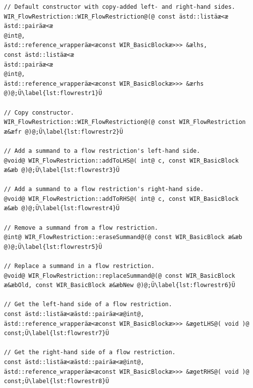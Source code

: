 \begin{lstlisting}[style=code,float=!b,caption={Public Interface of Class \texttt{WIR\_FlowRestriction}},label=lst:flowrestr]
// Default constructor with copy-added left- and right-hand sides.
WIR_FlowRestriction::WIR_FlowRestriction@(@ const ästd::listäæ<æ                                                                                                  ästd::pairäæ<æ                                                                                                  @int@,                                                                                                      ästd::reference_wrapperäæ<æconst WIR_BasicBlockæ>>> &ælhs,                                            const ästd::listäæ<æ                                                                                                  ästd::pairäæ<æ                                                                                                  @int@,                                                                                                      ästd::reference_wrapperäæ<æconst WIR_BasicBlockæ>>> &ærhs @)@;Ü\label{lst:flowrestr1}Ü

// Copy constructor.
WIR_FlowRestriction::WIR_FlowRestriction@(@ const WIR_FlowRestriction æ&æfr @)@;Ü\label{lst:flowrestr2}Ü

// Add a summand to a flow restriction's left-hand side.
@void@ WIR_FlowRestriction::addToLHS@( int@ c, const WIR_BasicBlock æ&æb @)@;Ü\label{lst:flowrestr3}Ü

// Add a summand to a flow restriction's right-hand side.
@void@ WIR_FlowRestriction::addToRHS@( int@ c, const WIR_BasicBlock æ&æb @)@;Ü\label{lst:flowrestr4}Ü

// Remove a summand from a flow restriction.
@int@ WIR_FlowRestriction::eraseSummand@(@ const WIR_BasicBlock æ&æb @)@;Ü\label{lst:flowrestr5}Ü

// Replace a summand in a flow restriction.
@void@ WIR_FlowRestriction::replaceSummand@(@ const WIR_BasicBlock æ&æbOld, const WIR_BasicBlock æ&æbNew @)@;Ü\label{lst:flowrestr6}Ü

// Get the left-hand side of a flow restriction.
const ästd::listäæ<æästd::pairäæ<æ@int@, ästd::reference_wrapperäæ<æconst WIR_BasicBlockæ>>> &ægetLHS@( void )@ const;Ü\label{lst:flowrestr7}Ü

// Get the right-hand side of a flow restriction.
const ästd::listäæ<æästd::pairäæ<æ@int@, ästd::reference_wrapperäæ<æconst WIR_BasicBlockæ>>> &ægetRHS@( void )@ const;Ü\label{lst:flowrestr8}Ü


\end{lstlisting}
